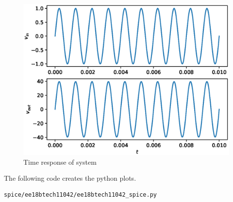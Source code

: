 \begin{enumerate}[label=\arabic*.,ref=\theenumi]
\begin{figure}[!ht]
    \includegraphics[width = \columnwidth]{./spice/ee18btech11042/spice.eps}
    \caption{Time response of system}
    \label{fig:ee18btech11042_3}
\end{figure}
The following code creates the python plots.
\begin{lstlisting}
spice/ee18btech11042/ee18btech11042_spice.py
\end{lstlisting}







\end{enumerate}



